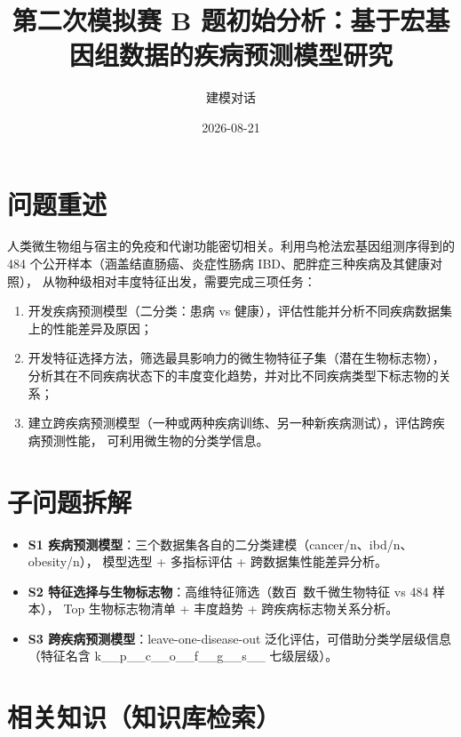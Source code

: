 \documentclass{internal-report}
\title{第二次模拟赛 B 题初始分析：基于宏基因组数据的疾病预测模型研究}
\author{建模对话}
\date{2026-08-21}
\begin{document}
\maketitle

\section{问题重述}

人类微生物组与宿主的免疫和代谢功能密切相关。利用鸟枪法宏基因组测序得到的
484 个公开样本（涵盖结直肠癌、炎症性肠病 IBD、肥胖症三种疾病及其健康对照），
从物种级相对丰度特征出发，需要完成三项任务：

\begin{enumerate}
  \item 开发疾病预测模型（二分类：患病 vs 健康），评估性能并分析不同疾病数据集上的性能差异及原因；
  \item 开发特征选择方法，筛选最具影响力的微生物特征子集（潜在生物标志物），
        分析其在不同疾病状态下的丰度变化趋势，并对比不同疾病类型下标志物的关系；
  \item 建立跨疾病预测模型（一种或两种疾病训练、另一种新疾病测试），评估跨疾病预测性能，
        可利用微生物的分类学信息。
\end{enumerate}

\section{子问题拆解}

\begin{itemize}
  \item \textbf{S1 疾病预测模型}：三个数据集各自的二分类建模（cancer/n、ibd/n、obesity/n），
        模型选型 + 多指标评估 + 跨数据集性能差异分析。
  \item \textbf{S2 特征选择与生物标志物}：高维特征筛选（数百~数千微生物特征 vs 484 样本），
        Top 生物标志物清单 + 丰度趋势 + 跨疾病标志物关系分析。
  \item \textbf{S3 跨疾病预测模型}：leave-one-disease-out 泛化评估，可借助分类学层级信息
        （特征名含 k\_\_p\_\_c\_\_o\_\_f\_\_g\_\_s\_\_ 七级层级）。
\end{itemize}

\section{相关知识（知识库检索）}
\end{document}
